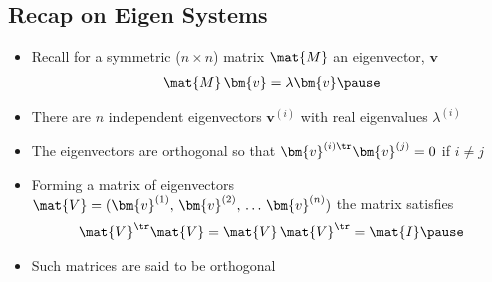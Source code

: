 
\Outline %

\begin{slide}
\section[-1]{Recap on Eigen Systems}

\begin{PauseHighLight}
  \begin{itemize}
  \item Recall for a symmetric ($n\times n$) matrix $\mat{M}$ an
    eigenvector, $\bm{v}$
    \begin{align*}
      \mat{M} \, \bm{v} = \lambda \bm{v}\pause
    \end{align*}
  \item There are $n$ independent eigenvectors $\bm{v}^{(i)}$ with
    real eigenvalues $\lambda^{(i)}$\pause
  \item The eigenvectors are orthogonal so that
    $\bm{v}^{(i)\tr}\bm{v}^{(j)}=0$  if $i\neq j$\pause
  \item Forming a matrix of eigenvectors
    $\mat{V}=(\bm{v}^{(1)},\,\bm{v}^{(2)},\, \ldots\,\bm{v}^{(n)})$ the matrix
    satisfies
    \begin{align*}
      \mat{V}^\tr \mat{V} = \mat{V}\,\mat{V}^\tr = \mat{I}\pause
    \end{align*}
  \item Such matrices are said to be orthogonal\pause
      \end{itemize}
\end{PauseHighLight}

\end{slide}


